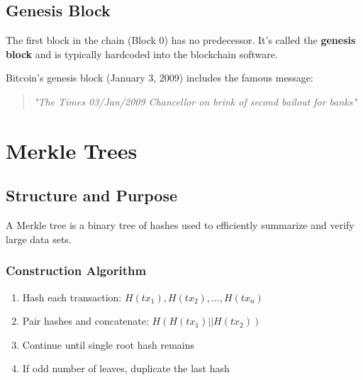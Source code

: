 \documentclass[11pt,a4paper]{article}
\begin{document}
\subsection{Genesis Block}

The first block in the chain (Block 0) has no predecessor. It's called the \textbf{genesis block} and is typically hardcoded into the blockchain software.

Bitcoin's genesis block (January 3, 2009) includes the famous message:
\begin{quote}
\textit{"The Times 03/Jan/2009 Chancellor on brink of second bailout for banks"}
\end{quote}

\section{Merkle Trees}

\subsection{Structure and Purpose}

A Merkle tree is a binary tree of hashes used to efficiently summarize and verify large data sets.

\subsubsection{Construction Algorithm}

\begin{enumerate}
  \item Hash each transaction: $H(tx_1), H(tx_2), \ldots, H(tx_n)$
  \item Pair hashes and concatenate: $H(H(tx_1) || H(tx_2))$
  \item Continue until single root hash remains
  \item If odd number of leaves, duplicate the last hash
\end{enumerate}
\end{document}
